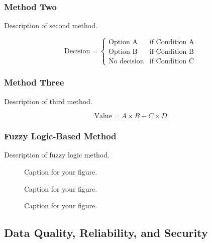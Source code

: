 \documentclass[12pt]{article}
\begin{document}
\subsubsection{Method Two}

Description of second method.

\begin{equation}
\text{Decision} = \begin{cases}
\text{Option A} & \text{if Condition A} \\
\text{Option B} & \text{if Condition B} \\
\text{No decision} & \text{if Condition C}
\end{cases}
\label{eq:decision_rule2}
\end{equation}

\subsubsection{Method Three}

Description of third method.

\begin{equation}
\text{Value} = A \times B + C \times D
\label{eq:composite}
\end{equation}

\subsubsection{Fuzzy Logic-Based Method}

Description of fuzzy logic method.

\begin{figure}[h!]
\centering
\caption{Caption for your figure.}
\label{fig:membership}
\end{figure}

\begin{figure}[h!]
\centering
\caption{Caption for your figure.}
\label{fig:rule_strength}
\end{figure}

\begin{figure}[h!]
\centering
\caption{Caption for your figure.}
\label{fig:defuzzification}
\end{figure}

\subsection{Data Quality, Reliability, and Security}
\end{document}
